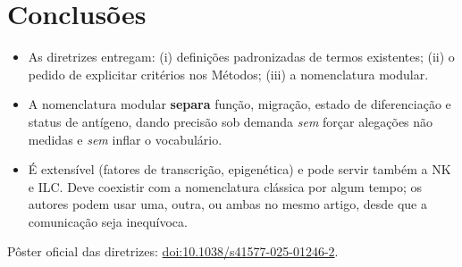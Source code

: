 \documentclass[11pt,a4paper]{article}
\begin{document}
\section{Conclusões}
\begin{itemize}[leftmargin=1.4em,itemsep=2pt]
  \item As diretrizes entregam: (i) definições padronizadas de termos existentes;
        (ii) o pedido de explicitar critérios nos Métodos; (iii) a nomenclatura modular.
  \item A nomenclatura modular \textbf{separa} função, migração, estado de diferenciação e
        status de antígeno, dando precisão sob demanda \emph{sem} forçar alegações não medidas
        e \emph{sem} inflar o vocabulário.
  \item É extensível (fatores de transcrição, epigenética) e pode servir também a NK e ILC.
        Deve coexistir com a nomenclatura clássica por algum tempo; os autores podem usar uma,
        outra, ou ambas no mesmo artigo, desde que a comunicação seja inequívoca.
\end{itemize}

\vfill
\begin{center}\small\color{softgray}
Pôster oficial das diretrizes:
\href{https://doi.org/10.1038/s41577-025-01246-2}{doi:10.1038/s41577-025-01246-2}.
\end{center}
\end{document}
